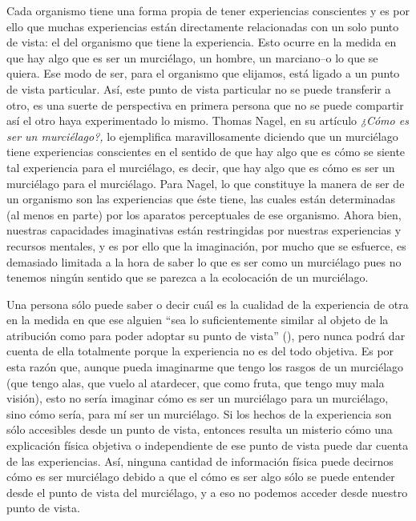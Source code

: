 \documentclass[]{book}
\begin{document}
\begin{refsection}
Cada organismo tiene una forma propia de tener experiencias conscientes
y es por ello que muchas experiencias están directamente relacionadas
con un solo punto de vista: el del organismo que tiene la experiencia.
Esto ocurre en la medida en que hay algo que es ser un murciélago, un
hombre, un marciano--o lo que se quiera. Ese modo de ser, para el
organismo que elijamos, está ligado a un punto de vista particular. Así,
este punto de vista particular no se puede transferir a otro, es una
suerte de perspectiva en primera persona que no se puede compartir así
el otro haya experimentado lo mismo. Thomas Nagel, en su artículo
\emph{¿Cómo es ser un murciélago?,} lo ejemplifica maravillosamente
diciendo que un murciélago tiene experiencias conscientes en el sentido
de que hay algo que es cómo se siente tal experiencia para el
murciélago, es decir, que hay algo que es cómo es ser un murciélago para
el murciélago. Para Nagel, lo que constituye la manera de ser de un
organismo son las experiencias que éste tiene, las cuales están
determinadas (al menos en parte) por los aparatos perceptuales de ese
organismo. Ahora bien, nuestras capacidades imaginativas están
restringidas por nuestras experiencias y recursos mentales, y es por
ello que la imaginación, por mucho que se esfuerce, es demasiado
limitada a la hora de saber lo que es ser como un murciélago pues no
tenemos ningún sentido que se parezca a la ecolocación de un murciélago.

Una persona sólo puede saber o decir cuál es la cualidad de la
experiencia de otra en la medida en que ese alguien ``sea lo
suficientemente similar al objeto de la atribución como para poder
adoptar su punto de vista'' (\cite{Nagel2003}), pero nunca podrá dar cuenta de ella
totalmente porque la experiencia no es del todo objetiva. Es por esta
razón que, aunque pueda imaginarme que tengo los rasgos de un murciélago
(que tengo alas, que vuelo al atardecer, que como fruta, que tengo muy
mala visión), esto no sería imaginar cómo es ser un murciélago para un
murciélago, sino cómo sería, para mí ser un murciélago. Si los hechos de
la experiencia son sólo accesibles desde un punto de vista, entonces
resulta un misterio cómo una explicación física objetiva o independiente
de ese punto de vista puede dar cuenta de las experiencias. Así, ninguna
cantidad de información física puede decirnos cómo es ser murciélago
debido a que el cómo es ser algo sólo se puede entender desde el punto
de vista del murciélago, y a eso no podemos acceder desde nuestro punto
de vista.


\end{refsection}
\end{document}
